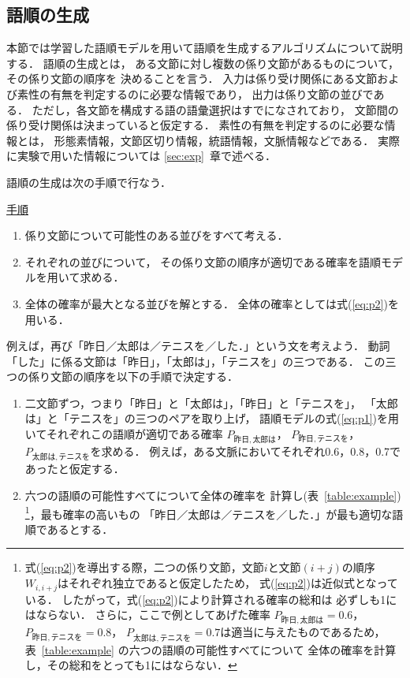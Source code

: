 \subsection{語順の生成}
\label{sec:generation}

本節では学習した語順モデルを用いて語順を生成するアルゴリズムについて説明する．
語順の生成とは，
ある文節に対し複数の係り文節があるものについて，その係り文節の順序を
決めることを言う．
入力は係り受け関係にある文節および素性の有無を判定するのに必要な情報であり，
出力は係り文節の並びである．
ただし，各文節を構成する語の語彙選択はすでになされており，
文節間の係り受け関係は決まっていると仮定する．
素性の有無を判定するのに必要な情報とは，
形態素情報，文節区切り情報，統語情報，文脈情報などである．
実際に実験で用いた情報については \ref{sec:exp}~章で述べる．

語順の生成は次の手順で行なう．

\underline{手順}

\begin{enumerate}
\item 係り文節について可能性のある並びをすべて考える．
\item それぞれの並びについて，
  その係り文節の順序が適切である確率を語順モデルを用いて求める．
\item 全体の確率が最大となる並びを解とする．
  全体の確率としては式(\ref{eq:p2})を用いる．
\end{enumerate}

例えば，再び「昨日／太郎は／テニスを／した．」という文を考えよう．
動詞「した」に係る文節は「昨日」，「太郎は」，「テニスを」の三つである．
この三つの係り文節の順序を以下の手順で決定する．
\begin{enumerate}
\item 二文節ずつ，つまり「昨日」と「太郎は」，「昨日」と「テニスを」，
  「太郎は」と「テニスを」の三つのペアを取り上げ，
  語順モデルの式(\ref{eq:p1})を用いてそれぞれこの語順が適切である確率
  $P_{昨日,太郎は}$，
  $P_{昨日,テニスを}$，
  $P_{太郎は,テニスを}$を求める．
  例えば，ある文脈においてそれぞれ0.6，0.8，0.7であったと仮定する．
\item 六つの語順の可能性すべてについて全体の確率を
  計算し(表~\ref{table:example})
  \footnote{
    式(\ref{eq:p2})を導出する際，二つの係り文節，文節$i$と文節$(i+j)$の順序
    $W_{i,i+j}$はそれぞれ独立であると仮定したため，
    式(\ref{eq:p2})は近似式となっている．
    したがって，式(\ref{eq:p2})により計算される確率の総和は
    必ずしも1にはならない．
    さらに，ここで例としてあげた確率
    $P_{昨日,太郎は}=0.6$，
    $P_{昨日,テニスを}=0.8$，
    $P_{太郎は,テニスを}=0.7$は適当に与えたものであるため，
    表~\ref{table:example} の六つの語順の可能性すべてについて
    全体の確率を計算し，その総和をとっても1にはならない．
    }，最も確率の高いもの
  「昨日／太郎は／テニスを／した．」が最も適切な語順であるとする．
\end{enumerate}

